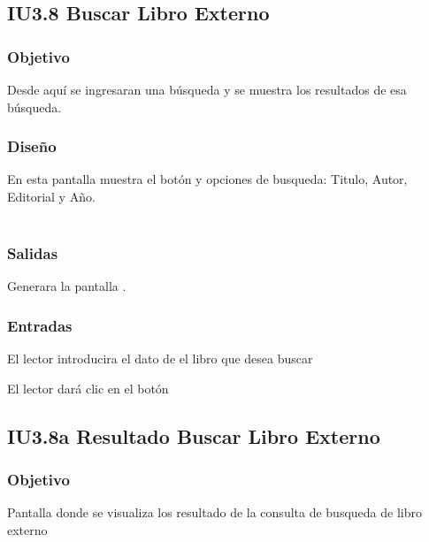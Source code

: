 \newpage
\subsection{IU3.8 Buscar Libro Externo}

\subsubsection{Objetivo}
	Desde aquí se ingresaran una búsqueda y se muestra los resultados de esa búsqueda.

\subsubsection{Diseño}
	En esta pantalla muestra el botón  y opciones de busqueda: Titulo, Autor, Editorial y Año.  \\\\


\subsubsection{Salidas}
	\begin{Citemize}
		\item Generara la pantalla . 
	\end{Citemize}
	
\subsubsection{Entradas}
	\begin{Citemize}
		\item El lector introducira el dato de el libro que desea buscar
		\item El lector dará clic en el botón \IUbutton{Buscar}
	\end{Citemize}




\subsection{IU3.8a Resultado Buscar Libro Externo}

\subsubsection{Objetivo}
	Pantalla donde se visualiza los resultado de la consulta de busqueda de libro externo

